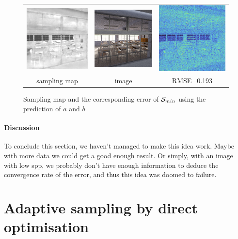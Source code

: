 \documentclass{classeENS}
\begin{document}
\begin{figure}[H]
    \centering
    \caption{Sampling map and the corresponding error of $\mathcal S_{min}$ using the prediction of $a$ and $b$}
    \begin{tabular}{ccc}
        \includegraphics[width=45mm]{image/without/psm.png}
        & \includegraphics[width=45mm]{image/without/pimage.png}
        & \includegraphics[width=45mm]{image/without/perror.png} \\
        sampling map & image & RMSE=0.193
    \end{tabular}
\end{figure}


\paragraph*{Discussion} To conclude this section, we haven't managed 
to make this idea work. Maybe with more data we could get a good 
enough result. Or simply, with an image with low spp, we probably 
don't have enough information to deduce the convergence rate of 
the error, and thus this idea was doomed to failure.

\section{Adaptive sampling by direct optimisation}
\end{document}
